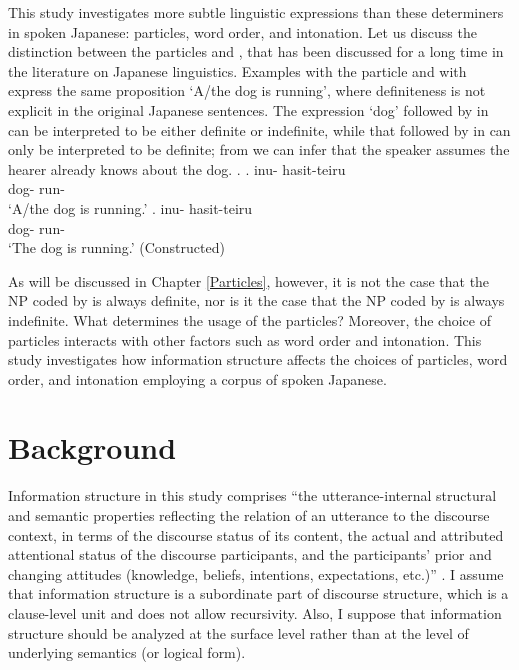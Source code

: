 This study investigates more subtle linguistic expressions than these determiners in spoken Japanese:
particles, word order, and intonation.
Let us discuss
the distinction between the particles  and ,
that has been discussed for a long time in the literature on Japanese linguistics.
Examples \Next[a] with the particle  and \Next[b] with 
express the same proposition `A/the dog is running',
where definiteness is not explicit in the original Japanese sentences.
The expression  `dog' followed by  in \Next[a]
can be interpreted to be either definite or indefinite,
while that followed by  in \Next[b]
can only be interpreted to be definite;
from \Next[b] we can infer that the speaker assumes the hearer already knows about the dog.
%
\ex.
 \ag. inu- hasit-teiru \\
      dog- run- \\
      `A/the dog is running.'
 \bg. inu- hasit-teiru \\
      dog- run- \\
      `The dog is running.'
 \hfill{(Constructed)}

As will be discussed in Chapter \ref{Particles},
however,
it is not the case that
the NP coded by  is always definite,
nor is it the case that
the NP coded by  is always indefinite.
What determines the usage of the particles?
Moreover,
the choice of particles interacts with other factors such as
word order and intonation.
This study investigates how information structure affects
the choices of particles, word order, and intonation
employing a corpus of spoken Japanese.

\section{Background}\label{IntroBackground}

Information structure in this study comprises
``the utterance-internal structural and semantic properties reflecting the relation of an utterance to the discourse context,
in terms of the discourse status of its content,
the actual and attributed attentional status of the discourse participants,
and the participants' prior and changing attitudes
(knowledge, beliefs, intentions, expectations, etc.)''
\cite[250]{kruijff-korbayovasteedman03}.
I assume that
information structure is a subordinate part of discourse structure,
which is a clause-level unit and does not allow recursivity.
Also, I suppose that information structure should be analyzed at the surface level rather than at the level of underlying semantics (or logical form).

